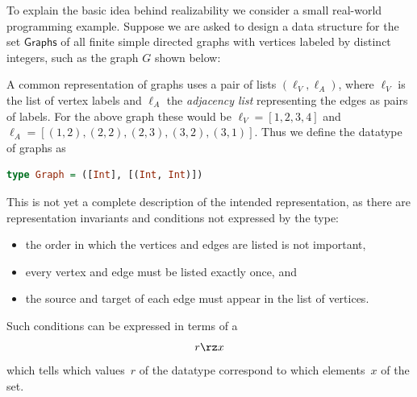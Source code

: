To explain the basic idea behind realizability we consider a small real-world programming example. Suppose we are asked to design a data structure for the set $\mathsf{Graphs}$ of all finite simple directed graphs with vertices labeled by distinct integers, such as the graph $G$ shown below:
%
\begin{center}
\end{center}
%
A common representation of graphs uses a pair of lists $(\ell_V, \ell_A)$, where $\ell_V$ is the list of vertex labels and $\ell_A$ the \emph{adjacency list} representing the edges as pairs of labels. For the above graph these would be $\ell_V = [1, 2, 3, 4]$ and $\ell_A = [(1,2), (2,2), (2,3), (3,2), (3,1)]$.
%
Thus we define the datatype of graphs as
%
\begin{lstlisting}[language=Haskell]
type Graph = ([Int], [(Int, Int)])
\end{lstlisting}
%
This is not yet a complete description of the intended representation, as there are representation invariants and conditions not expressed by the type:
%
\begin{itemize}
\item the order in which the vertices and edges are listed is not
  important,
\item every vertex and edge must be listed exactly once, and
\item the source and target of each edge must appear in the list of vertices.
\end{itemize}
%
Such conditions can be expressed in terms of a 
\begin{equation*}
  r \rz x
\end{equation*}
%
which tells which values~$r$ of the datatype correspond to which elements~$x$ of the set.
